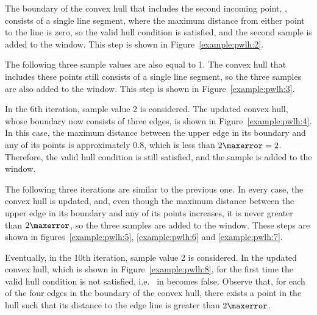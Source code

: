 

\newcommand{\widthh}{\textit{distance}}
The boundary of the convex hull that includes the second incoming point, , consists of a single line segment, where the maximum distance from either point to the line is zero, so the valid hull condition is satisfied, and the second sample is added to the window. This step is shown in Figure~\ref{example:pwlh:2}.




\clearpage


The following three sample values are also equal to 1. The convex hull that includes these points still consists of a single line segment, so the three samples are also added to the window. This step is shown in Figure~\ref{example:pwlh:3}.




In the 6th iteration, sample value 2 is considered. The updated convex hull, whose boundary now consists of three edges, is shown in Figure~\ref{example:pwlh:4}. In this case, the maximum distance between the upper edge in its boundary and any of its points is approximately $0.8$, which is less than $2\maxerror=2$. Therefore, the valid hull condition is still satisfied, and the sample is added to the window.




\clearpage


The following three iterations are similar to the previous one. In every case, the convex hull is updated, and, even though the maximum distance between the upper edge in its boundary and any of its points increases, it is never greater than $2\maxerror$, so the three samples are added to the window. These steps are shown in figures~\ref{example:pwlh:5}, \ref{example:pwlh:6} and \ref{example:pwlh:7}. 




\clearpage




Eventually, in the 10th iteration, sample value 2 is considered. In the updated convex hull, which is shown in Figure~\ref{example:pwlh:8}, for the first time the valid hull condition is not satisfied, i.e. \validHull\ in  becomes false. Observe that, for each of the four edges in the boundary of the convex hull, there exists a point in the hull such that its distance to the edge line is greater than $2\maxerror$. 


